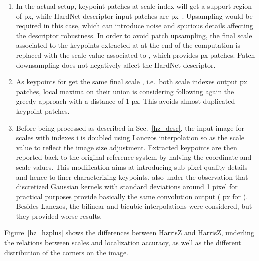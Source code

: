 \documentclass[times,twocolumn,final,authoryear]{elsarticle}
\begin{document}
\begin{enumerate}
	and likewise for  from the vertical derivatives  and . As shown in Fig.~\ref{hz_mask},  and  produce a better edge mask  but, according to our preliminary experiments, they should not be used for computing the filter response  since they lead to worse results.
	\begin{figure}[ht]
		\center
		\vspace{-1em}
		\caption{\label{hz_mask}
			Computation of the mask  for a color image . Mask portions retained in any case are in yellow, while mask regions considered only with or without the integration of the HSV value channel are respectively in green and red (see text for details, best viewed in color and zoomed in).}
	\end{figure}
	\item\label{s5} In the actual setup, keypoint patches at scale index  will get a support region of  px, while HardNet descriptor input patches are  px~\citep{hardnet}. Upsampling would be required in this case, which can introduce noise and spurious details affecting the descriptor robustness. In order to avoid patch upsampling, the final scale associated to the keypoints extracted at  at the end of the computation is replaced with the scale value associated to , which provides  px patches. Patch downsampling does not negatively affect the HardNet descriptor.
	\item\label{s6} As keypoints for  get the same final scale , i.e.~both scale indexes output  px patches, local maxima on their union is considering following again the greedy approach with a distance of 1 px. This avoids almost-duplicated keypoint patches.
	\item\label{s7} Before being processed as described in Sec.~\ref{hz_desc}, the input image for scales with indexes i  is doubled using Lanczos interpolation so as the scale value  to reflect the image size adjustment. Extracted keypoints are then reported back to the original reference system by halving the coordinate and scale values. This modification aims at introducing sub-pixel quality details and hence to finer characterizing keypoints, also under the observation that discretized Gaussian kernels with standard deviations around 1 pixel for practical purposes provide basically the same convolution output ( px for ). Besides Lanczos, the bilinear and bicubic interpolations were considered, but they provided worse results.	
\end{enumerate}
Figure~\ref{hz_hzplus} shows the differences between HarrisZ and HarrisZ, underling the relations between scales and localization accuracy, as well as the different distribution of the corners on the image. 
\end{document}
